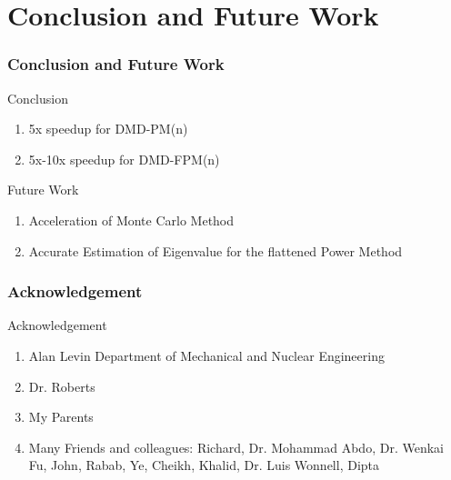 \documentclass[fleqn]{beamer}
\begin{document}
\section{Conclusion and Future Work}
\begin{frame}
\frametitle{Conclusion and Future Work}
\begin{block}{Conclusion}
\begin{enumerate}
\item 5x speedup for DMD-PM(n)
\item 5x-10x speedup for DMD-FPM(n)
\end{enumerate}
\end{block}
\begin{block}{ Future Work}
\begin{enumerate}
\item Acceleration of Monte Carlo Method 
\item Accurate Estimation of Eigenvalue for the flattened Power Method 
\end{enumerate}
\end{block}
\end{frame}  

\begin{frame}
\frametitle{Acknowledgement}
\begin{block}{Acknowledgement}
\begin{enumerate}
\item Alan Levin Department of Mechanical and Nuclear Engineering
\item Dr. Roberts
\item My Parents
\item Many Friends and colleagues: Richard, Dr. Mohammad Abdo,  Dr. Wenkai Fu, John, Rabab, Ye, Cheikh, Khalid, Dr. Luis Wonnell, Dipta
\end{enumerate}
\end{block}
\end{frame}

\beginbackup %
\end{document}
